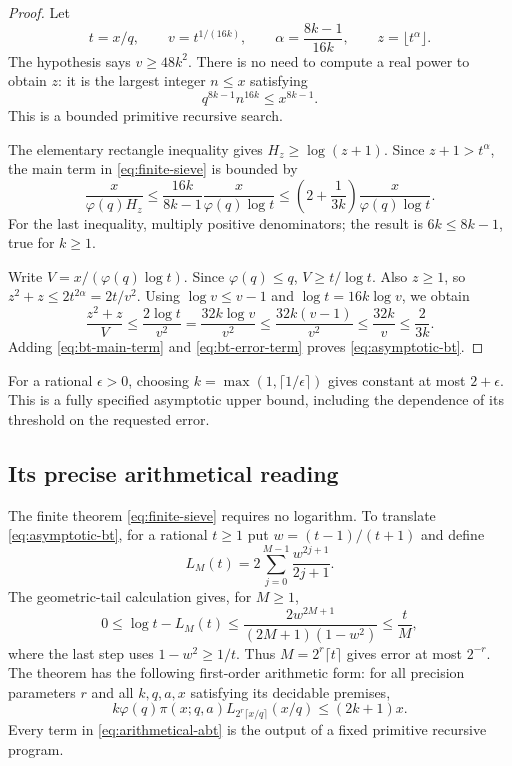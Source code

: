 \begin{proof}
Let
\[
 t=x/q,\qquad v=t^{1/(16k)},\qquad
 \alpha=\frac{8k-1}{16k},\qquad z=\lfloor t^\alpha\rfloor.
\]
The hypothesis says $v\geq48k^2$.  There is no need to compute a real
power to obtain $z$: it is the largest integer $n\leq x$ satisfying
\begin{equation}
 q^{8k-1}n^{16k}\leq x^{8k-1}.
 \label{eq:root-bounded-search}
\end{equation}
This is a bounded primitive recursive search.

The elementary rectangle inequality gives $H_z\geq\log(z+1)$.
Since $z+1>t^\alpha$, the main term in
\eqref{eq:finite-sieve} is bounded by
\begin{equation}
 \frac{x}{\varphi(q)H_z}
 \leq\frac{16k}{8k-1}\frac{x}{\varphi(q)\log t}
 \leq\left(2+\frac1{3k}\right)
          \frac{x}{\varphi(q)\log t}.
 \label{eq:bt-main-term}
\end{equation}
For the last inequality, multiply positive denominators; the result
is $6k\leq8k-1$, true for $k\geq1$.

Write $V=x/(\varphi(q)\log t)$.  Since $\varphi(q)\leq q$,
$V\geq t/\log t$.  Also $z\geq1$, so
$z^2+z\leq2t^{2\alpha}=2t/v^2$.  Using
$\log v\leq v-1$ and $\log t=16k\log v$, we obtain
\begin{equation}
 \frac{z^2+z}{V}
 \leq\frac{2\log t}{v^2}
 =\frac{32k\log v}{v^2}
 \leq\frac{32k(v-1)}{v^2}
 \leq\frac{32k}{v}
 \leq\frac2{3k}.
 \label{eq:bt-error-term}
\end{equation}
Adding \eqref{eq:bt-main-term} and \eqref{eq:bt-error-term} proves
\eqref{eq:asymptotic-bt}.
\end{proof}

For a rational $\epsilon>0$, choosing
$k=\max(1,\lceil1/\epsilon\rceil)$ gives constant at most
$2+\epsilon$.  This is a fully specified asymptotic upper bound,
including the dependence of its threshold on the requested error.

\subsection{Its precise arithmetical reading}

The finite theorem \eqref{eq:finite-sieve} requires no logarithm.  To
translate \eqref{eq:asymptotic-bt}, for a rational $t\geq1$ put
$w=(t-1)/(t+1)$ and define
\[
 L_M(t)=2\sum_{j=0}^{M-1}\frac{w^{2j+1}}{2j+1}.
\]
The geometric-tail calculation gives, for $M\geq1$,
\[
 0\leq\log t-L_M(t)
 \leq\frac{2w^{2M+1}}{(2M+1)(1-w^2)}
 \leq\frac tM,
\]
where the last step uses $1-w^2\geq1/t$.  Thus
$M=2^r\lceil t\rceil$ gives error at most $2^{-r}$.
The theorem has the following first-order arithmetic form: for all
precision parameters $r$ and all $k,q,a,x$ satisfying its decidable
premises,
\begin{equation}
 k\varphi(q)\pi(x;q,a)
 L_{2^r\lceil x/q\rceil}(x/q)\leq(2k+1)x.
 \label{eq:arithmetical-abt}
\end{equation}
Every term in \eqref{eq:arithmetical-abt} is the output of a fixed
primitive recursive program.

